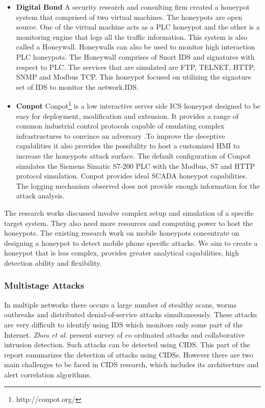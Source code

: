 \documentclass[article,msc=informatik,type=msc,colorback,accentcolor=tud9c]{tudthesis}
\begin{document}
\begin{itemize}
	
	\item\textbf{Digital Bond}	A security research and consulting firm created a honeypot system that comprised of two virtual machines. The honeypots are open source. One of the virtual machine acts as a \ac{PLC} honeypot and the other is a monitoring engine that logs all the traffic information. This system is also called a Honeywall. Honeywalls can also be used to monitor high interaction \ac{PLC} honeypots. The Honeywall comprises of Snort IDS and signatures with respect to \ac{PLC}. The services that are simulated are FTP, TELNET, HTTP, SNMP and Modbus TCP. This honeypot focused on utilizing the signature set of \ac{IDS} to monitor the network.\ac{IDS}. 


	
	\item\textbf{Conpot}
	Conpot\footnote{http://conpot.org/} is a low interactive server side \ac{ICS} honeypot designed to be easy for deployment, modification and extension. It provides a range of common industrial control protocols capable of emulating complex infrastructures to convince an adversary .To improve the deceptive capabilities it also provides the possibility to host a customized \ac{HMI} to increase the honeypots attack surface. The default configuration of Conpot simulates the Siemens Simatic S7-200 \ac{PLC} with the Modbus, S7 and HTTP protocol simulation. Conpot provides ideal SCADA honeypot capabilities. The logging mechanism observed does not provide enough information for the attack analysis. 
	
	\end{itemize}
	
	The research works discussed involve complex setup and  simulation of a specific target system. They also need more resources and computing power to host the honeypots. The existing research work on mobile honeypots concentrate on designing a honeypot to detect mobile phone specific attacks.  We aim to create a honeypot that is less complex, provides greater analytical capabilities, high detection ability and flexibility.
	
	
	\subsubsection{Multistage Attacks}\label{Multistage Attacks}
	
	
	In multiple networks there occurs a large number of stealthy scans, worms outbreaks and distributed denial-of-service attacks simultaneously. These attacks are very difficult to identify using \ac{IDS} which monitors only some part of the Internet. \textit{Zhou et al.}  present survey\cite{zhou2010survey} of co ordinated attacks and collaborative intrusion detection. Such attacks can be detected using \ac{CIDS}. This part of the report summarizes the detection of attacks using \ac{CIDS}s. However there are two main challenges to be faced in \ac{CIDS} research, which includes its architecture and alert correlation algorithms. 
	
\end{document}
